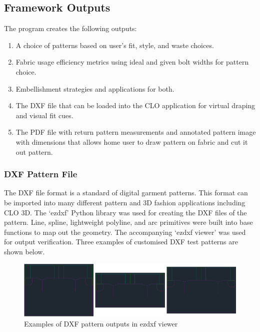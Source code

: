 
\subsection{Framework Outputs}
The program creates the following outputs:
\begin{enumerate}
    \item A choice of patterns based on user's fit, style, and waste choices.
    \item Fabric usage efficiency metrics using ideal and given bolt widths for pattern choice.
    \item Embellishment strategies and applications for both.
    \item The DXF file that can be loaded into the CLO application for virtual draping and visual fit cues.
    \item The PDF file with return pattern measurements and annotated pattern image with dimensions that allows home user to draw pattern on fabric and cut it out pattern.
\end{enumerate}

\subsubsection{DXF Pattern File}
The DXF file format is a standard of digital garment patterns. This format can be imported into many different pattern and 3D fashion applications including CLO 3D. The ‘ezdxf’ Python library was used for creating the DXF files of the pattern. Line, spline, lightweight polyline, and arc primitives were built into base functions to map out the geometry. The accompanying ‘ezdxf viewer’ was used for output verification. Three examples of customised DXF test patterns are shown below.

\begin{figure} [H] %
    \centering %
    \includegraphics[width = \textwidth]{Images/example dxfs.png} %
    \caption{Examples of DXF pattern outputs in ezdxf viewer}
    \label{} %
\end{figure}


